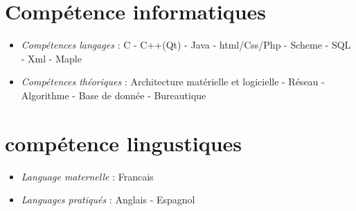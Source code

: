 \documentclass[a4paper]{article}
\begin{document}
\section*{Compétence informatiques}
\begin{itemize}
\item\emph{Compétences langages} : C - C++(Qt) - Java - html/Css/Php - Scheme - SQL - Xml - Maple
\item \emph{Compétences théoriques} : Architecture matérielle et logicielle - Réseau - Algorithme - Base de donnée - Bureautique
\end{itemize}

\section*{compétence lingustiques}

\begin{itemize}
\item \emph{Language maternelle} : Francais
\item \emph{Languages pratiqués} : Anglais - Espagnol
\end{itemize}
\end{document}
